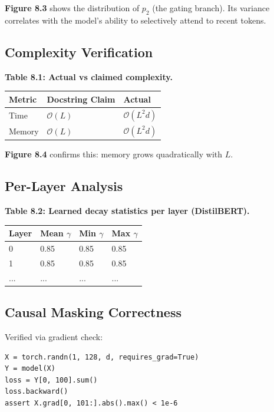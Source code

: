 \textbf{Figure 8.3} shows the distribution of $p_2$ (the gating branch). Its 
variance correlates with the model's ability to selectively attend to 
recent tokens.

\subsection{Complexity Verification}

\textbf{Table 8.1: Actual vs claimed complexity.}

\begin{table}[H]
\centering
\small
\begin{tabular}{lll}
\toprule
\textbf{Metric} & \textbf{Docstring Claim} & \textbf{Actual} \\
\midrule
Time & $\mathcal{O}(L)$ & $\mathcal{O}(L^2 d)$ \\
Memory & $\mathcal{O}(L)$ & $\mathcal{O}(L^2 d)$ \\
\bottomrule
\end{tabular}
\end{table}

\textbf{Figure 8.4} confirms this: memory grows quadratically with $L$.

\subsection{Per-Layer Analysis}

\textbf{Table 8.2: Learned decay statistics per layer (DistilBERT).}

\begin{table}[H]
\centering
\small
\begin{tabular}{llll}
\toprule
\textbf{Layer} & \textbf{Mean $\gamma$} & \textbf{Min $\gamma$} & \textbf{Max $\gamma$} \\
\midrule
0 & 0.85 & 0.85 & 0.85 \\
1 & 0.85 & 0.85 & 0.85 \\
... & ... & ... & ... \\
\bottomrule
\end{tabular}
\end{table}

\subsection{Causal Masking Correctness}

Verified via gradient check:

\begin{lstlisting}
X = torch.randn(1, 128, d, requires_grad=True)
Y = model(X)
loss = Y[0, 100].sum()
loss.backward()
assert X.grad[0, 101:].abs().max() < 1e-6
\end{lstlisting}

